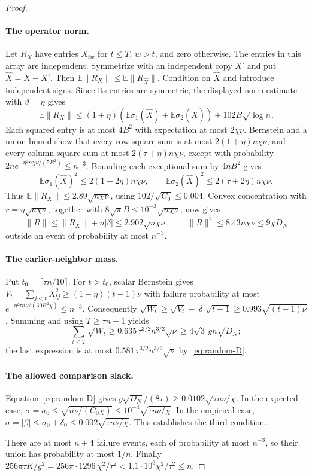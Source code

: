 \documentclass[11pt,a4paper]{article}
\theoremstyle{definition}
\theoremstyle{remark}
\newcommand{\E}{\mathbb E}
\begin{document}
\begin{proof}
\paragraph{The operator norm.}
Let $R_X$ have entries $X_{tw}$ for $t\le T$, $w>t$, and zero otherwise.
The entries in this array are independent. Symmetrize with an independent
copy $X'$ and put $\widehat X=X-X'$. Then
$\E\|R_X\|\le\E\|R_{\widehat X}\|$.
Condition on $\widehat X$ and introduce independent signs. Since its entries
are symmetric, the displayed norm estimate with $\vartheta=\eta$ gives
\[
 \E\|R_X\|\le
 (1+\eta)(\E\sigma_1(\widehat X)+\E\sigma_2(\widehat X))
       +102B\sqrt{\log n}.
\]
Each squared entry is at most $4B^2$ with expectation at most $2\chi\nu$.
Bernstein and a union bound show that every row-square sum is at most
$2(1+\eta)n\chi\nu$, and every column-square sum at most
$2(\tau+\eta)n\chi\nu$, except with probability
$2n e^{-\eta^2n\chi\nu/(5B^2)}\le n^{-3}$.
Bounding each exceptional sum by $4nB^2$ gives
\[
 \E\sigma_1(\widehat X)^2\le2(1+2\eta)n\chi\nu,\qquad
 \E\sigma_2(\widehat X)^2\le2(\tau+2\eta)n\chi\nu.
\]
Thus $\E\|R_X\|\le2.89\sqrt{n\chi\nu}$, using
$102/\sqrt{C_0}\le0.004$. Convex concentration with
$r=\eta\sqrt{n\chi\nu}$, together with
$8\sqrt\pi B\le10^{-3}\sqrt{n\chi\nu}$, now gives
\[
 \|R\|\le\|R_X\|+n|\delta|\le2.902\sqrt{n\chi\nu},
 \qquad \|R\|^2\le8.43n\chi\nu\le9\chi D_N
\]
outside an event of probability at most $n^{-3}$.

\paragraph{The earlier-neighbor mass.}
Put $t_0=\lceil\tau n/10\rceil$. For $t>t_0$, scalar Bernstein gives
$V_t=\sum_{j<t}X_{tj}^2\ge(1-\eta)(t-1)\nu$ with failure probability at most
$e^{-\eta^2\tau n\nu/(30B^2\chi)}\le n^{-3}$.
Consequently $\sqrt{W_t}\ge\sqrt{V_t}-|\delta|\sqrt{t-1}
\ge0.993\sqrt{(t-1)\nu}$. Summing and using $T\ge\tau n-1$ yields
\[
 \sum_{t\le T}\sqrt{W_t}
 \ge0.635\,\tau^{3/2}n^{3/2}\sqrt\nu
 \ge4\sqrt3\,g n\sqrt{D_N};
\]
the last expression is at most
$0.581\,\tau^{3/2}n^{3/2}\sqrt\nu$ by~\eqref{eq:random-D}.

\paragraph{The allowed comparison slack.}
Equation~\eqref{eq:random-D} gives
$g\sqrt{D_N}/(8\tau)\ge0.0102\sqrt{\tau n\nu/\chi}$.
In the expected case,
$\sigma=\sigma_0\le\sqrt{n\nu/(C_0\chi)}
\le10^{-4}\sqrt{\tau n\nu/\chi}$.
In the empirical case,
$\sigma=|\beta|\le\sigma_0+\delta_0
\le0.002\sqrt{\tau n\nu/\chi}$.
This establishes the third condition.

There are at most $n+4$ failure events, each of probability at most
$n^{-3}$, so their union has probability at most $1/n$.
Finally
$256\pi\tau K/g^2=256\pi\cdot1296\,\chi^2/\tau^2
<1.1\cdot10^6\chi^2/\tau^2\le n$.
\end{proof}
\end{document}
